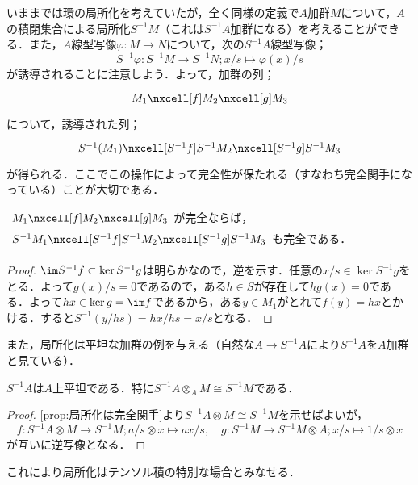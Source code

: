 いままでは環の局所化を考えていたが，全く同様の定義で$A$加群$M$について，$A$の積閉集合による局所化$S^{-1}M$（これは$S^{-1}A$加群になる）を考えることができる．また，$A$線型写像$\varphi:M\to N$について，次の$S^{-1}A$線型写像；
\[S^{-1}\varphi:S^{-1}M\to S^{-1}N;x/s\mapsto \varphi(x)/s\]
が誘導されることに注意しよう．よって，加群の列；
\[\begin{tikzcd}
M_1\nxcell[f]M_2\nxcell[g]M_3
\end{tikzcd}\]
について，誘導された列；
\[\begin{tikzcd}
S^{-1}(M_1)\nxcell[S^{-1}f]S^{-1}M_2\nxcell[S^{-1}g]S^{-1}M_3
\end{tikzcd}\]
が得られる．ここでこの操作によって完全性が保たれる（すなわち完全関手になっている）ことが大切である．

\begin{prop}\label{prop:局所化は完全関手}
	$\begin{tikzcd}
	M_1\nxcell[f]M_2\nxcell[g]M_3
	\end{tikzcd}$が完全ならば，$\begin{tikzcd}
	S^{-1}M_1\nxcell[S^{-1}f]S^{-1}M_2\nxcell[S^{-1}g]S^{-1}M_3
	\end{tikzcd}$も完全である．
\end{prop}
\begin{proof}
	$\im S^{-1}f\subset\ker S^{-1}g$は明らかなので，逆を示す．任意の$x/s\in\ker S^{-1}g$をとる．よって$g(x)/s=0$であるので，ある$h\in S$が存在して$hg(x)=0$である．よって$hx\in\ker g=\im f$であるから，ある$y\in M_1$がとれて$f(y)=hx$とかける．すると$S^{-1}(y/hs)=hx/hs=x/s$となる．
\end{proof}

また，局所化は平坦な加群の例を与える（自然な$A\to S^{-1}A$により$S^{-1}A$を$A$加群と見ている）．
\begin{prop}
	$S^{-1}A$は$A$上平坦である．特に$S^{-1}A\otimes_A M\cong S^{-1}M$である．
\end{prop}

\begin{proof}
	\ref{prop:局所化は完全関手}より$S^{-1}A\otimes M\cong S^{-1}M$を示せばよいが，	
	\[f:S^{-1}A\otimes M\to S^{-1}M;a/s\otimes x\mapsto ax/s,\quad g:S^{-1}M\to S^{-1}M\otimes A;x/s\mapsto 1/s\otimes x\]
	が互いに逆写像となる．
\end{proof}

これにより局所化はテンソル積の特別な場合とみなせる．

